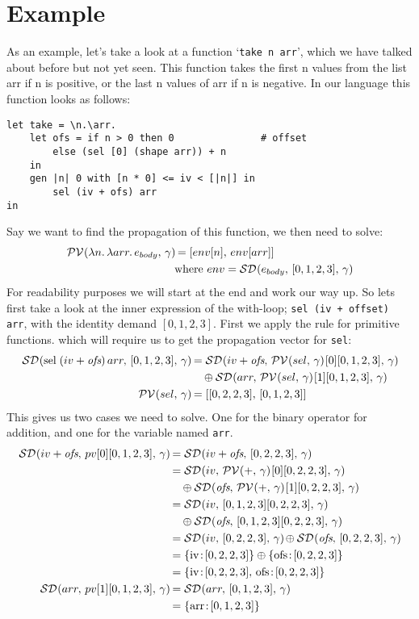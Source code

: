 \documentclass[../main.tex]{subfiles}
\begin{document}
\section{Example}
As an example, let's take a look at a function `\texttt{take n arr}', which we have talked about before but not yet seen. This function takes the first n values from the list arr if n is positive, or the last n values of arr if n is negative. In our language this function looks as follows:
\begin{verbatim}
let take = \n.\arr.
    let ofs = if n > 0 then 0               # offset
        else (sel [0] (shape arr)) + n
    in
    gen |n| 0 with [n * 0] <= iv < [|n|] in
        sel (iv + ofs) arr
in
\end{verbatim}

Say we want to find the propagation of this function, we then need to solve:
\begin{align*}
    \mathcal{PV}\hspace{-1.2pt} \left( \lambda n.\, \lambda arr.\, e_{body},\, \gamma \right) \hspace{-1pt}
        &= [env[n],\, env[arr]] \\
        &\text{where } env = \mathcal{SD}\hspace{-1.2pt} \left( e_{body},\, [0,1,2,3],\, \gamma \right) \hspace{-1pt}
\end{align*}
%
For readability purposes we will start at the end and work our way up. So lets first take a look at the inner expression of the with-loop; \texttt{sel (iv + offset) arr}, with the identity demand $[0,1,2,3]$.
First we apply the rule for primitive functions. which will require us to get the propagation vector for \texttt{sel}:
\begin{align*}
    \mathcal{SD}\hspace{-1.2pt} \left( \text{sel}\; (iv + \textit{ofs})\, arr,\, [0,1,2,3],\, \gamma \right) \hspace{-1pt}
        &= \mathcal{SD}\hspace{-1.2pt} \left( iv + \textit{ofs},\, \mathcal{PV}\hspace{-1.2pt} \left( sel,\, \gamma \right) \hspace{-1pt}[0][0,1,2,3],\, \gamma \right) \hspace{-1pt}
            \\&\hspace{1em}\oplus \mathcal{SD}\hspace{-1.2pt} \left( arr,\, \mathcal{PV}\hspace{-1.2pt} \left( sel,\, \gamma \right) \hspace{-1pt}[1][0,1,2,3],\, \gamma \right) \hspace{-1pt} \\
    \mathcal{PV}\hspace{-1.2pt} \left( sel,\, \gamma \right) \hspace{-1pt} &= [[0,2,2,3],\, [0,1,2,3]]
\end{align*}
%
This gives us two cases we need to solve. One for the binary operator for addition, and one for the variable named \texttt{arr}.
\begin{align*}
    \sd{iv + \textit{ofs}}{pv[0][0,1,2,3]}
        &= \sd{iv + \textit{ofs}}{[0,2,2,3]} \\
        &= \sd{iv}{\pv{+}[0][0,2,2,3]}
            \oplusnl \sd{\textit{ofs}}{\pv{+}[1][0,2,2,3]} \\
        &= \sd{iv}{[0,1,2,3][0,2,2,3]}
            \oplusnl \sd{\textit{ofs}}{[0,1,2,3][0,2,2,3]} \\
        &= \sd{iv}{[0,2,2,3]} \oplus \sd{\textit{ofs}}{[0,2,2,3]} \\
        &= \{ \dem{iv}{[0,2,2,3]} \} \oplus \{ \dem{ofs}{[0,2,2,3]} \} \\
        &= \{ \dem{iv}{[0,2,2,3]},\, \dem{ofs}{[0,2,2,3]} \} \\
    \sd{arr}{pv[1][0,1,2,3]}
        &= \sd{arr}{[0,1,2,3]} \\
        &= \{ \dem{arr}{[0,1,2,3]} \}
\end{align*}
\end{document}
